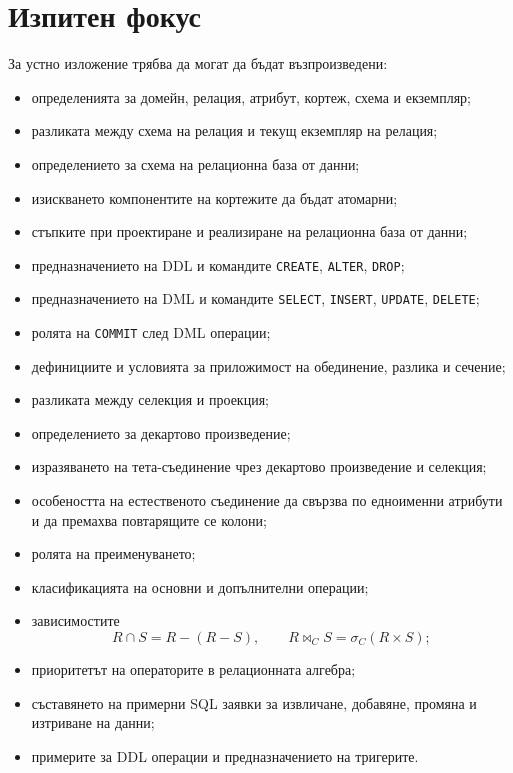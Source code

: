 \section{Изпитен фокус}\label{s:23.6}

За устно изложение трябва да могат да бъдат възпроизведени:

\begin{itemize}
    \item определенията за домейн, релация, атрибут, кортеж, схема и екземпляр;
    \item разликата между схема на релация и текущ екземпляр на релация;
    \item определението за схема на релационна база от данни;
    \item изискването компонентите на кортежите да бъдат атомарни;
    \item стъпките при проектиране и реализиране на релационна база от данни;
    \item предназначението на DDL и командите \texttt{CREATE}, \texttt{ALTER}, \texttt{DROP};
    \item предназначението на DML и командите \texttt{SELECT}, \texttt{INSERT}, \texttt{UPDATE}, \texttt{DELETE};
    \item ролята на \texttt{COMMIT} след DML операции;
    \item дефинициите и условията за приложимост на обединение, разлика и сечение;
    \item разликата между селекция и проекция;
    \item определението за декартово произведение;
    \item изразяването на тета-съединение чрез декартово произведение и селекция;
    \item особеността на естественото съединение да свързва по едноименни атрибути и да премахва повтарящите се колони;
    \item ролята на преименуването;
    \item класификацията на основни и допълнителни операции;
    \item зависимостите
    \[
    R\cap S=R-(R-S),\qquad
    R\bowtie_C S=\sigma_C(R\times S);
    \]
    \item приоритетът на операторите в релационната алгебра;
    \item съставянето на примерни SQL заявки за извличане, добавяне, промяна и изтриване на данни;
    \item примерите за DDL операции и предназначението на тригерите.
\end{itemize}
